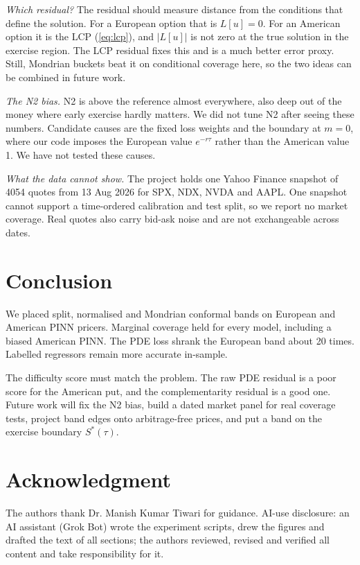 \documentclass[conference]{IEEEtran}
\begin{document}
\emph{Which residual?} The residual should measure distance from the conditions that define the solution. For a European option that is $L[u]=0$. For an American option it is the LCP (\ref{eq:lcp}), and $|L[u]|$ is not zero at the true solution in the exercise region. The LCP residual fixes this and is a much better error proxy. Still, Mondrian buckets beat it on conditional coverage here, so the two ideas can be combined in future work.

\emph{The N2 bias.} N2 is above the reference almost everywhere, also deep out of the money where early exercise hardly matters. We did not tune N2 after seeing these numbers. Candidate causes are the fixed loss weights and the boundary at $m=0$, where our code imposes the European value $e^{-r\tau}$ rather than the American value 1. We have not tested these causes.

\emph{What the data cannot show.} The project holds one Yahoo Finance snapshot of 4054 quotes from 13 Aug 2026 for SPX, NDX, NVDA and AAPL. One snapshot cannot support a time-ordered calibration and test split, so we report no market coverage. Real quotes also carry bid-ask noise and are not exchangeable across dates.

\section{Conclusion}
We placed split, normalised and Mondrian conformal bands on European and American PINN pricers. Marginal coverage held for every model, including a biased American PINN. The PDE loss shrank the European band about 20 times. Labelled regressors remain more accurate in-sample.

The difficulty score must match the problem. The raw PDE residual is a poor score for the American put, and the complementarity residual is a good one. Future work will fix the N2 bias, build a dated market panel for real coverage tests, project band edges onto arbitrage-free prices, and put a band on the exercise boundary $S^*(\tau)$.

\section*{Acknowledgment}
The authors thank Dr. Manish Kumar Tiwari for guidance. AI-use disclosure: an AI assistant (Grok Bot) wrote the experiment scripts, drew the figures and drafted the text of all sections; the authors reviewed, revised and verified all content and take responsibility for it.



\end{document}
